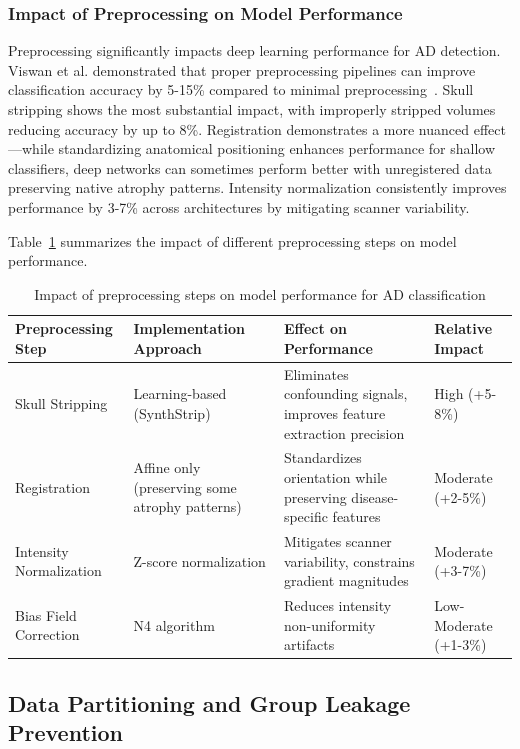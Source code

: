 \documentclass[12pt, a4paper]{article}
\begin{document}
\subsubsection{Impact of Preprocessing on Model Performance}

Preprocessing significantly impacts deep learning performance for AD detection. Viswan et al. demonstrated that proper preprocessing pipelines can improve classification accuracy by 5-15\% compared to minimal preprocessing~\cite{viswan2025enhancing}. Skull stripping shows the most substantial impact, with improperly stripped volumes reducing accuracy by up to 8\%. Registration demonstrates a more nuanced effect—while standardizing anatomical positioning enhances performance for shallow classifiers, deep networks can sometimes perform better with unregistered data preserving native atrophy patterns. Intensity normalization consistently improves performance by 3-7\% across architectures by mitigating scanner variability.

Table~\ref{tab:preprocessing_impact} summarizes the impact of different preprocessing steps on model performance.

\begin{table}[htbp]
\centering
\begin{tabular}{|p{3cm}|p{5cm}|p{5cm}|p{2cm}|}
\hline
\textbf{Preprocessing Step} & \textbf{Implementation Approach} & \textbf{Effect on Performance} & \textbf{Relative Impact} \\
\hline
Skull Stripping & Learning-based (SynthStrip) & Eliminates confounding signals, improves feature extraction precision & High (+5-8\%) \\
\hline
Registration & Affine only (preserving some atrophy patterns) & Standardizes orientation while preserving disease-specific features & Moderate (+2-5\%) \\
\hline
Intensity Normalization & Z-score normalization & Mitigates scanner variability, constrains gradient magnitudes & Moderate (+3-7\%) \\
\hline
Bias Field Correction & N4 algorithm & Reduces intensity non-uniformity artifacts & Low-Moderate (+1-3\%) \\
\hline
\end{tabular}
\caption{Impact of preprocessing steps on model performance for AD classification}
\label{tab:preprocessing_impact}
\end{table}

\subsection{Data Partitioning and Group Leakage Prevention}
\label{subsec:data_partitioning}
\end{document}
